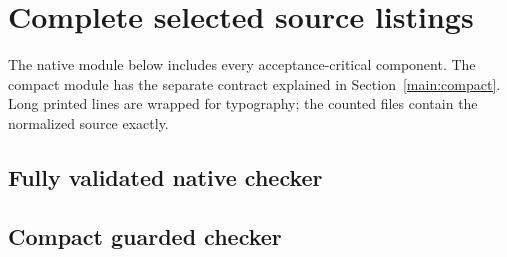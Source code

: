 \documentclass[11pt]{article}
\theoremstyle{definition}\newtheorem{definition}[theorem]{Definition}
\theoremstyle{remark}\newtheorem{remark}[theorem]{Remark}
\begin{document}









\clearpage
\section{Complete selected source listings}
\label{app:listings}
The native module below includes every acceptance-critical component.
The compact module has the separate contract explained in
Section~\ref{main:compact}. Long printed lines are wrapped for typography;
the counted files contain the normalized source exactly.
\subsection{Fully validated native checker}

\subsection{Compact guarded checker}

\end{document}
